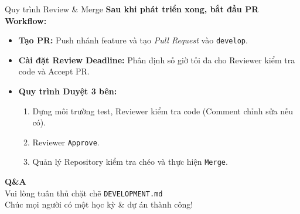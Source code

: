 \documentclass[10pt, aspectratio=169]{beamer}
\begin{document}
\begin{frame}{Quy trình Review \& Merge}
    \textbf{Sau khi phát triển xong, bắt đầu PR Workflow:}
    \begin{itemize}
        \item \textbf{Tạo PR:} Push nhánh feature và tạo \textit{Pull Request} vào \texttt{develop}.
        \item \textbf{Cài đặt Review Deadline:} Phân định số giờ tối đa cho Reviewer kiểm tra code và Accept PR.
        \item \textbf{Quy trình Duyệt 3 bên:}
        \begin{enumerate}
            \item Dựng môi trường test, Reviewer kiểm tra code (Comment chỉnh sửa nếu có).
            \item Reviewer \texttt{Approve}.
            \item Quản lý Repository kiểm tra chéo và thực hiện \texttt{Merge}.
        \end{enumerate}
    \end{itemize}
\end{frame}

\begin{frame}
    \begin{center}
        \Huge \textbf{Q\&A} \\
        \vspace{0.8cm}
        \normalsize Vui lòng tuân thủ chặt chẽ \texttt{DEVELOPMENT.md} \\
        \small Chúc mọi người có một học kỳ \& dự án thành công!
    \end{center}
\end{frame}
\end{document}
